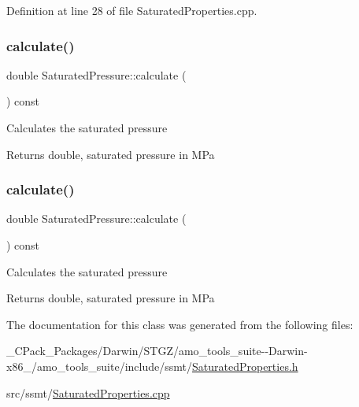 Definition at line 28 of file Saturated\+Properties.\+cpp.

\mbox{\label{class_saturated_pressure_a8ef5357b4f8af1aeaa8dde6ae05b9daa}} 
\subsubsection{\texorpdfstring{calculate()}{calculate()}\hspace{0.1cm}{\footnotesize\ttfamily [2/3]}}
{\footnotesize\ttfamily double Saturated\+Pressure\+::calculate (\begin{DoxyParamCaption}{ }\end{DoxyParamCaption}) const}

Calculates the saturated pressure \begin{DoxyReturn}{Returns}
double, saturated pressure in M\+Pa 
\end{DoxyReturn}
\mbox{\label{class_saturated_pressure_a8ef5357b4f8af1aeaa8dde6ae05b9daa}} 
\subsubsection{\texorpdfstring{calculate()}{calculate()}\hspace{0.1cm}{\footnotesize\ttfamily [3/3]}}
{\footnotesize\ttfamily double Saturated\+Pressure\+::calculate (\begin{DoxyParamCaption}{ }\end{DoxyParamCaption}) const}

Calculates the saturated pressure \begin{DoxyReturn}{Returns}
double, saturated pressure in M\+Pa 
\end{DoxyReturn}


The documentation for this class was generated from the following files\+:\begin{DoxyCompactItemize}
\item 
\+\_\+\+C\+Pack\+\_\+\+Packages/\+Darwin/\+S\+T\+G\+Z/amo\+\_\+tools\+\_\+suite-\/-\/\+Darwin-\/x86\+\_/amo\+\_\+tools\+\_\+suite/include/ssmt/\hyperlink{___c_pack___packages_2_darwin_2_s_t_g_z_2amo__tools__suite--_darwin-x86__64_2amo__tools__suite_2b97ccf799ea6561aa4d6a618c8073459}{Saturated\+Properties.\+h}\item 
src/ssmt/\hyperlink{_saturated_properties_8cpp}{Saturated\+Properties.\+cpp}\end{DoxyCompactItemize}
